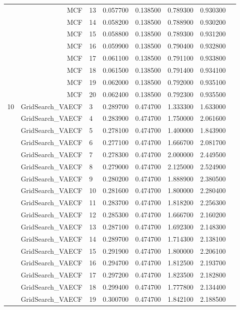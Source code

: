 \documentclass[a4paper,12pt]{article}
\begin{document}
\begin{center}
\begin{longtable}{lrlrrrrr}
& MCF & 13 & 0.057700 & 0.138500 & 0.789300 & 0.930300 \\
& MCF & 14 & 0.058200 & 0.138500 & 0.788900 & 0.930200 \\
& MCF & 15 & 0.058800 & 0.138500 & 0.789300 & 0.931200 \\
& MCF & 16 & 0.059900 & 0.138500 & 0.790400 & 0.932800 \\
& MCF & 17 & 0.061100 & 0.138500 & 0.791100 & 0.933800 \\
& MCF & 18 & 0.061500 & 0.138500 & 0.791400 & 0.934100 \\
& MCF & 19 & 0.062000 & 0.138500 & 0.792000 & 0.935100 \\
& MCF & 20 & 0.062400 & 0.138500 & 0.792300 & 0.935500 \\ \hline
\multirow{18}{1cm}{10} & GridSearch\_VAECF & 3 & 0.289700 & 0.474700 & 1.333300 & 1.633000 \\
& GridSearch\_VAECF & 4 & 0.283900 & 0.474700 & 1.750000 & 2.061600 \\
& GridSearch\_VAECF & 5 & 0.278100 & 0.474700 & 1.400000 & 1.843900 \\
& GridSearch\_VAECF & 6 & 0.277100 & 0.474700 & 1.666700 & 2.081700 \\
& GridSearch\_VAECF & 7 & 0.278300 & 0.474700 & 2.000000 & 2.449500 \\
& GridSearch\_VAECF & 8 & 0.279000 & 0.474700 & 2.125000 & 2.524900 \\
& GridSearch\_VAECF & 9 & 0.280200 & 0.474700 & 1.888900 & 2.380500 \\
& GridSearch\_VAECF & 10 & 0.281600 & 0.474700 & 1.800000 & 2.280400 \\
& GridSearch\_VAECF & 11 & 0.283700 & 0.474700 & 1.818200 & 2.256300 \\
& GridSearch\_VAECF & 12 & 0.285300 & 0.474700 & 1.666700 & 2.160200 \\
& GridSearch\_VAECF & 13 & 0.287100 & 0.474700 & 1.692300 & 2.148300 \\
& GridSearch\_VAECF & 14 & 0.289700 & 0.474700 & 1.714300 & 2.138100 \\
& GridSearch\_VAECF & 15 & 0.291900 & 0.474700 & 1.800000 & 2.206100 \\
& GridSearch\_VAECF & 16 & 0.294700 & 0.474700 & 1.812500 & 2.193700 \\
& GridSearch\_VAECF & 17 & 0.297200 & 0.474700 & 1.823500 & 2.182800 \\
& GridSearch\_VAECF & 18 & 0.299400 & 0.474700 & 1.777800 & 2.134400 \\
& GridSearch\_VAECF & 19 & 0.300700 & 0.474700 & 1.842100 & 2.188500 \\

\end{longtable}
\end{center}
\end{document}
